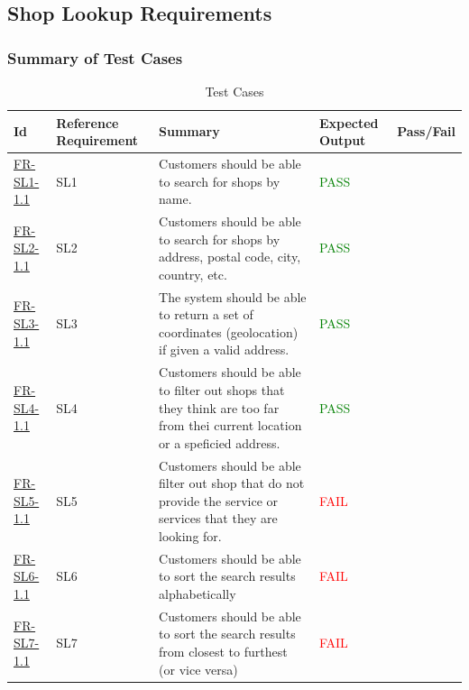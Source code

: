 \documentclass[12pt, titlepage]{article}
\newcommand{\testpass}{\textcolor{green}{PASS}}
\newcommand{\testfail}{\textcolor{red}{FAIL}}
\begin{document}
        \subsection{Shop Lookup Requirements}
            \subsubsection{Summary of Test Cases}
            \begin{table}[H]
                \centering
                \begin{tabularx}{\textwidth}{|l|p{2cm}|X|X|c|}
                    \hline
                    Id & Reference Requirement & Summary & Expected Output & Pass/Fail \\ \hline
                    \hyperref[FR-SL-1.1]{FR-SL1-1.1} & SL1 & Customers should be able to search for shops by name. & \testpass \\ \hline
                    \hyperref[FR-SL-2.1]{FR-SL2-1.1} & SL2 & Customers should be able to search for shops by address, postal code, city, country, etc. & \testpass \\ \hline
                    \hyperref[FR-SL-3.1]{FR-SL3-1.1} & SL3 & The system should be able to return a set of coordinates (geolocation) if given a valid address. & \testpass \\ \hline
                    \hyperref[FR-SL-4.1]{FR-SL4-1.1} & SL4 & Customers should be able to filter out shops that they think are too far from thei current location or a speficied address. & \testpass \\ \hline
                    \hyperref[FR-SL-5.1]{FR-SL5-1.1} & SL5 & Customers should be able filter out shop that do not provide the service or services that they are looking for. & \testfail \\ \hline
                    \hyperref[FR-SL-5.1]{FR-SL6-1.1} & SL6 & Customers should be able to sort the search results alphabetically & \testfail \\ \hline
                    \hyperref[FR-SL-5.1]{FR-SL7-1.1} & SL7 & Customers should be able to sort the search results from closest to furthest (or vice versa) & \testfail \\ \hline
                \end{tabularx}
                \caption{Test Cases}
                \label{tab:Test_Cases}
            \end{table}
            
\end{document}

